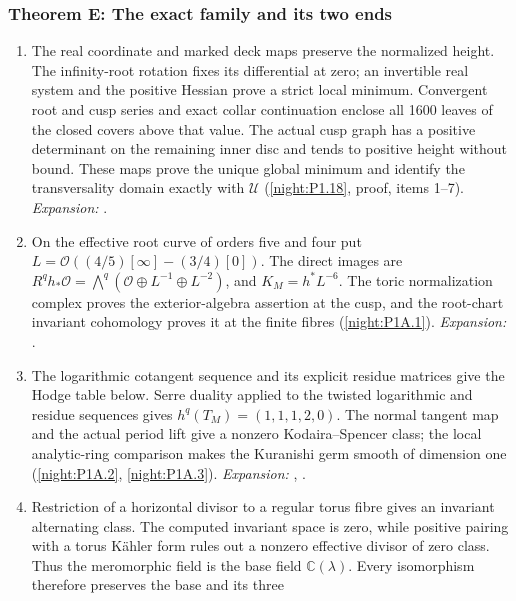 \hypertarget{outline-V-E}{}
\subsubsection*{Theorem E: The exact family and its two ends}
\begin{enumerate}[label=\arabic*.,leftmargin=*]
\item\hypertarget{step-V-E-1}{} The real coordinate and marked deck maps preserve the normalized
  height. The infinity-root rotation fixes its differential at zero;
  an invertible real system and the positive Hessian prove a strict
  local minimum. Convergent root and cusp series and exact collar
  continuation enclose all 1600 leaves of the closed covers above
  that value. The actual cusp graph has a positive determinant on
  the remaining inner disc and tends to positive height without
  bound. These maps prove the unique global minimum and identify
  the transversality domain exactly with $\mathcal U$
  (\cref{night:P1.18}, proof, items 1--7).
\textit{Expansion:} .
\item\hypertarget{step-V-E-2}{} On the effective root curve of orders five and four put
  $L=\mathcal O((4/5)[\infty]-(3/4)[0])$.  The direct images are
  $R^qh_*\mathcal O=\bigwedge^q
  (\mathcal O\oplus L^{-1}\oplus L^{-2})$, and
  $K_M=h^*L^{-6}$.  The toric normalization complex proves the
  exterior-algebra assertion at the cusp, and the root-chart
  invariant cohomology proves it at the finite fibres
  (\cref{night:P1A.1}).
\textit{Expansion:} .
\item\hypertarget{step-V-E-3}{} The logarithmic cotangent sequence and its explicit residue
  matrices give the Hodge table below.  Serre duality applied to
  the twisted logarithmic and residue sequences gives
  $h^q(T_M)=(1,1,1,2,0)$.  The normal tangent map and the actual
  period lift give a nonzero Kodaira--Spencer class; the local
  analytic-ring comparison makes the Kuranishi germ smooth of
  dimension one (\cref{night:P1A.2}, \cref{night:P1A.3}).
\textit{Expansion:} , .
\item\hypertarget{step-V-E-4}{} Restriction of a horizontal divisor to a regular torus fibre
  gives an invariant alternating class.  The computed invariant
  space is zero, while positive pairing with a torus Kähler form
  rules out a nonzero effective divisor of zero class.  Thus the
  meromorphic field is the base field $\mathbb C(\lambda)$.
  Every isomorphism therefore preserves the base and its three

\end{enumerate}
